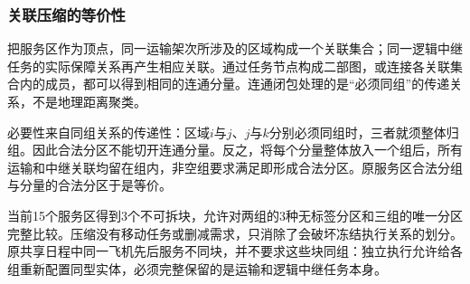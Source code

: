 \subsubsection{关联压缩的等价性}
把服务区作为顶点，同一运输架次所涉及的区域构成一个关联集合；同一逻辑中继任务的实际保障关系再产生相应关联。通过任务节点构成二部图，或连接各关联集合内的成员，都可以得到相同的连通分量。连通闭包处理的是“必须同组”的传递关系，不是地理距离聚类。

必要性来自同组关系的传递性：区域$i$与$j$、$j$与$k$分别必须同组时，三者就须整体归组。因此合法分区不能切开连通分量。反之，将每个分量整体放入一个组后，所有运输和中继关联均留在组内，非空组要求满足即形成合法分区。原服务区合法分组与分量的合法分区于是等价。

当前15个服务区得到3个不可拆块，允许对两组的3种无标签分区和三组的唯一分区完整比较。压缩没有移动任务或删减需求，只消除了会破坏冻结执行关系的划分。原共享日程中同一飞机先后服务不同块，并不要求这些块同组：独立执行允许给各组重新配置同型实体，必须完整保留的是运输和逻辑中继任务本身。
